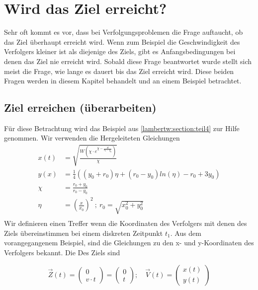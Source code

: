 %
%
%
\section{Wird das Ziel erreicht?
\label{lambertw:section:teil1}}

Sehr oft kommt es vor, dass bei Verfolgungsproblemen die Frage auftaucht, ob das Ziel überhaupt erreicht wird.
Wenn zum Beispiel die Geschwindigkeit des Verfolgers kleiner ist als diejenige des Ziels, gibt es Anfangsbedingungen bei denen das Ziel nie erreicht wird.
Sobald diese Frage beantwortet wurde stellt sich meist die Frage, wie lange es dauert bis das Ziel erreicht wird.
Diese beiden Fragen werden in diesem Kapitel behandelt und an einem Beispiel betrachtet.

\subsection{Ziel erreichen (überarbeiten)
\label{lambertw:subsection:ZielErreichen}}
Für diese Betrachtung wird das Beispiel aus \eqref{lambertw:section:teil4} zur Hilfe genommen.
Wir verwenden die Hergeleiteten Gleichungen
\begin{align*}
    x\left(t\right)
    &=
    \sqrt{\frac{W\left(\chi\cdot e^{\chi-\frac{4t}{r_0-y_0}}\right)}{\chi}} \\
    y(x)
    &=
    \frac{1}{4}\left(\left(y_0+r_0\right)\eta+\left(r_0-y_0\right)ln\left(\eta\right)-r_0+3y_0\right) \\
    \chi
    &=
    \frac{r_0+y_0}{r_0-y_0}\\
    \eta
    &=
    \left(\frac{x}{x_0}\right)^2 
    \:;\:
    r_0
    =
    \sqrt{x_0^2+y_0^2} \\
\end{align*}
Wir definieren einen Treffer wenn die Koordinaten des Verfolgers mit denen des Ziels übereinstimmen bei einem diskreten Zeitpunkt $t_1$. Aus dem vorangegangenem Beispiel, sind die Gleichungen zu den x- und y-Koordinaten des Verfolgers bekannt. Die Des Ziels sind

\begin{equation}
    \vec{Z}(t)
    =
    \left( \begin{array}{c} 0 \\ v \cdot t \end{array} \right)
    =
    \left( \begin{array}{c} 0 \\ t \end{array} \right)
    ;\quad
    \vec{V}(t)
    =
    \left( \begin{array}{c} x(t) \\ y(t) \end{array} \right)
    \label{lambertw:Anfangspunkte}
\end{equation}

